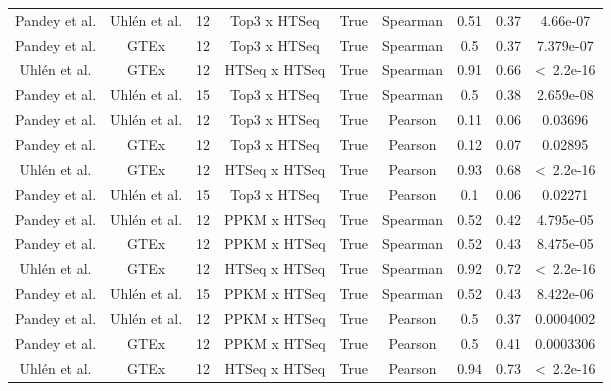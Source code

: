 \begin{landscape}
\begin{longtable}{@{}ccccccccc@{}}
\endhead
%
\bottomrule
\endfoot
%
\endlastfoot
%
Pandey et al. & Uhlén et al. & 12 & Top3 x HTSeq & True & Spearman & 0.51 & 0.37 & 4.66e-07 \\
Pandey et al. & GTEx & 12 & Top3 x HTSeq & True & Spearman & 0.5 & 0.37 & 7.379e-07 \\
{\color[HTML]{9B9B9B} Uhlén et al.} & {\color[HTML]{9B9B9B} GTEx} & {\color[HTML]{9B9B9B} 12} & {\color[HTML]{9B9B9B} HTSeq x HTSeq} & {\color[HTML]{9B9B9B} True} & {\color[HTML]{9B9B9B} Spearman} & {\color[HTML]{9B9B9B} 0.91} & {\color[HTML]{9B9B9B} 0.66} & {\color[HTML]{9B9B9B} \textless\ 2.2e-16} \\
Pandey et al. & Uhlén et al. & 15 & Top3 x HTSeq & True & Spearman & 0.5 & 0.38 & 2.659e-08 \\
Pandey et al. & Uhlén et al. & 12 & Top3 x HTSeq & True & Pearson & 0.11 & 0.06 & 0.03696 \\
Pandey et al. & GTEx & 12 & Top3 x HTSeq & True & Pearson & 0.12 & 0.07 & 0.02895 \\
{\color[HTML]{9B9B9B} Uhlén et al.} & {\color[HTML]{9B9B9B} GTEx} & {\color[HTML]{9B9B9B} 12} & {\color[HTML]{9B9B9B} HTSeq x HTSeq} & {\color[HTML]{9B9B9B} True} & {\color[HTML]{9B9B9B} Pearson} & {\color[HTML]{9B9B9B} 0.93} & {\color[HTML]{9B9B9B} 0.68} & {\color[HTML]{9B9B9B} \textless\ 2.2e-16} \\
Pandey et al. & Uhlén et al. & 15 & Top3 x HTSeq & True & Pearson & 0.1 & 0.06 & 0.02271 \\
Pandey et al. & Uhlén et al. & 12 & PPKM x HTSeq & True & Spearman & 0.52 & 0.42 & 4.795e-05 \\
Pandey et al. & GTEx & 12 & PPKM x HTSeq & True & Spearman & 0.52 & 0.43 & 8.475e-05 \\
{\color[HTML]{9B9B9B} Uhlén et al.} & {\color[HTML]{9B9B9B} GTEx} & {\color[HTML]{9B9B9B} 12} & {\color[HTML]{9B9B9B} HTSeq x HTSeq} & {\color[HTML]{9B9B9B} True} & {\color[HTML]{9B9B9B} Spearman} & {\color[HTML]{9B9B9B} 0.92} & {\color[HTML]{9B9B9B} 0.72} & {\color[HTML]{9B9B9B} \textless\ 2.2e-16} \\
Pandey et al. & Uhlén et al. & 15 & PPKM x HTSeq & True & Spearman & 0.52 & 0.43 & 8.422e-06 \\
Pandey et al. & Uhlén et al. & 12 & PPKM x HTSeq & True & Pearson & 0.5 & 0.37 & 0.0004002 \\
Pandey et al. & GTEx & 12 & PPKM x HTSeq & True & Pearson & 0.5 & 0.41 & 0.0003306 \\
{\color[HTML]{9B9B9B} Uhlén et al.} & {\color[HTML]{9B9B9B} GTEx} & {\color[HTML]{9B9B9B} 12} & {\color[HTML]{9B9B9B} HTSeq x HTSeq} & {\color[HTML]{9B9B9B} True} & {\color[HTML]{9B9B9B} Pearson} & {\color[HTML]{9B9B9B} 0.94} & {\color[HTML]{9B9B9B} 0.73} & {\color[HTML]{9B9B9B} \textless\ 2.2e-16} \\

\end{longtable}
\end{landscape}
